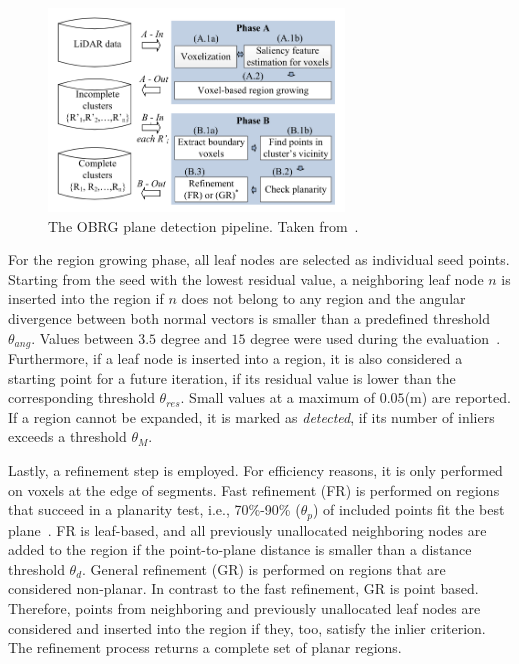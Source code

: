\documentclass[main.tex]{subfiles}
\begin{document}
\begin{figure}[H]
    \centering
    \includegraphics[width=0.7\textwidth]{images/obrg.png}
    \caption[OBRG Pipeline]{The OBRG plane detection pipeline. Taken from~\cite[Figure~1]{Vo_Truong-Hong_Laefer_Bertolotto_2015}.}
    \label{fig:obrg}
\end{figure}

For the region growing phase, all leaf nodes are selected as individual seed points. 
Starting from the seed with the lowest residual value, a neighboring leaf node $n$ is inserted into the region if $n$ 
does not belong to any region and the angular divergence between both normal vectors is smaller than a predefined threshold 
$\theta_{ang}$. Values between $3.5$ degree and $15$ degree were used during the  evaluation~\cite[Tables~1,4,7]{Vo_Truong-Hong_Laefer_Bertolotto_2015}.
Furthermore, if a leaf node is inserted into a region, it is also considered a starting point for a future iteration, 
if its residual value is lower than the corresponding threshold $\theta_{res}$. Small values at a maximum of $0.05$(m)
are reported. If a region cannot be expanded, it is marked as \textit{detected}, if its number of inliers exceeds a 
threshold $\theta_M$.
  
Lastly, a refinement step is employed. 
For efficiency reasons, it is only performed on voxels at the edge of segments.
Fast refinement (FR) is performed on regions that succeed in a planarity test, i.e., 70\%-90\% ($\theta_p$) 
of included points fit the best plane~\cite[Section~3.4]{Vo_Truong-Hong_Laefer_Bertolotto_2015}. 
FR is leaf-based, and all previously unallocated neighboring nodes are added to the region if the point-to-plane distance is smaller 
than a distance threshold $\theta_d$.
General refinement (GR) is performed on regions that are considered non-planar. In contrast to the fast refinement, GR is point based. Therefore,
points from neighboring and previously unallocated leaf nodes are considered and inserted into the region if they, too, satisfy the inlier criterion.
The refinement process returns a complete set of planar regions.
\end{document}
